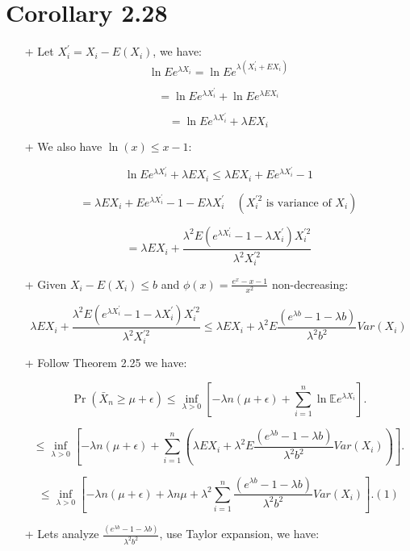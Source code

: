 \documentclass{article}
\begin{document}
\section{Corollary 2.28}

\begin{itemize}
    \item[+] Let $X_i^{'} = X_i - E(X_i)$, we have:
    \[
    \ln Ee^{\lambda X_i} = \ln Ee^{\lambda(X_i^{'} + EX_i)}
    \]

    \[
    = \ln Ee^{\lambda X_i^{'}} +\ln Ee^{\lambda EX_i}
    \]
    
    \[
    = \ln Ee^{\lambda X_i^{'}} + \lambda EX_i
    \]
    \item[+] We also have $\ln(x) \leq x - 1$:

    \[
    \ln Ee^{\lambda X_i^{'}} + \lambda EX_i \leq\lambda EX_i + Ee^{\lambda X_i^{'}} - 1
    \]

    \[
     = \lambda EX_i + Ee^{\lambda X_i^{'}} - 1 - E\lambda X_i^{'} \quad (X_i^{'2} \mbox{ is variance of  } X_i)
    \]

    \[
     = \lambda EX_i + \frac{\lambda ^ 2 E(e^{\lambda X_i^{'}} - 1 - \lambda X_i^{'})X_i^{'2}}{\lambda ^ 2 X_i^{'2}}
    \]

    + Given $X_i - E(X_i) \leq b$ and $\phi(x) = \frac{e^x - x - 1}{x^2}$ non-decreasing:

    \[
     \lambda EX_i + \frac{\lambda ^ 2 E(e^{\lambda X_i^{'}} - 1 - \lambda X_i^{'})X_i^{'2}}{\lambda ^ 2 X_i^{'2}} \leq \lambda EX_i + \lambda ^ 2 E\frac{(e^{\lambda b} - 1 - \lambda b)}{\lambda ^ 2 b^2} Var(X_i)
    \]

    \item[+] Follow Theorem 2.25 we have:
    
    \[
    \Pr(\bar{X}_n \geq \mu + \epsilon) \leq \inf_{\lambda>0} 
    \left[ -\lambda n(\mu + \epsilon) + \sum_{i=1}^n \ln \mathbb{E} e^{\lambda X_i} \right].
    \]
    
    \[
    \leq \inf_{\lambda>0} 
    \left[ -\lambda n(\mu + \epsilon) + \sum_{i=1}^n (\lambda EX_i + \lambda ^ 2 E\frac{(e^{\lambda b} - 1 - \lambda b)}{\lambda ^ 2 b^2} Var(X_i)) \right].
    \]

    \[
    \leq \inf_{\lambda>0} 
    \left[ -\lambda n(\mu + \epsilon) +  \lambda n \mu + \lambda ^ 2 \sum_{i=1}^n\frac{(e^{\lambda b} - 1 - \lambda b)}{\lambda^2 b^2}Var(X_i) \right]. (1)
    \]

    \item[+] Lets analyze $\frac{(e^{\lambda b} - 1 - \lambda b)}{\lambda^2 b^2}$, use Taylor expansion, we have:


\end{itemize}
\end{document}
